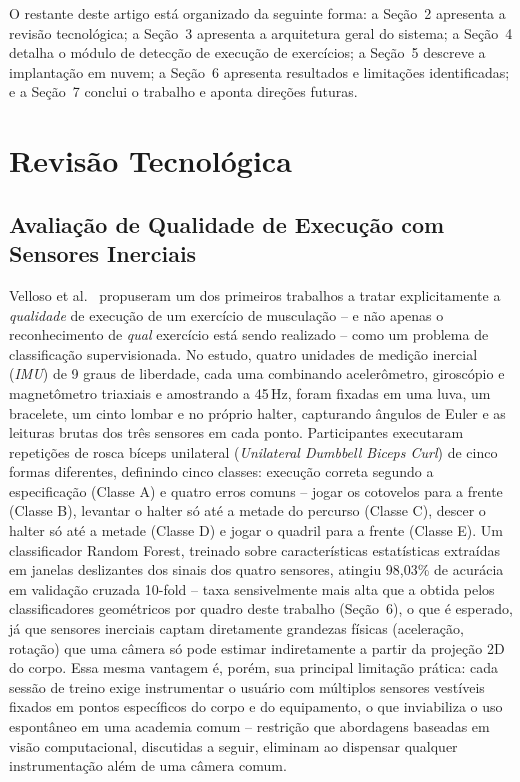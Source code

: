 \documentclass[12pt]{article}
\begin{document}
O restante deste artigo está organizado da seguinte forma: a Seção~2
apresenta a revisão tecnológica; a Seção~3 apresenta a arquitetura geral do
sistema; a Seção~4 detalha o módulo de detecção de execução de exercícios;
a Seção~5 descreve a implantação em nuvem; a Seção~6 apresenta resultados e
limitações identificadas; e a Seção~7 conclui o trabalho e aponta
direções futuras.

\section{Revisão Tecnológica}

\subsection{Avaliação de Qualidade de Execução com Sensores Inerciais}

Velloso et al.~\cite{velloso2013hars} propuseram um dos primeiros trabalhos
a tratar explicitamente a \textit{qualidade} de execução de um exercício de
musculação -- e não apenas o reconhecimento de \textit{qual} exercício está
sendo realizado -- como um problema de classificação supervisionada. No
estudo, quatro unidades de medição inercial (\textit{IMU}) de 9 graus de
liberdade, cada uma combinando acelerômetro, giroscópio e magnetômetro
triaxiais e amostrando a 45\,Hz, foram fixadas em uma luva, um bracelete, um
cinto lombar e no próprio halter, capturando ângulos de Euler e as leituras
brutas dos três sensores em cada ponto. Participantes executaram repetições
de rosca bíceps unilateral (\textit{Unilateral Dumbbell Biceps Curl}) de
cinco formas diferentes, definindo cinco classes: execução correta segundo a
especificação (Classe A) e quatro erros comuns -- jogar os cotovelos para a
frente (Classe B), levantar o halter só até a metade do percurso (Classe C),
descer o halter só até a metade (Classe D) e jogar o quadril para a frente
(Classe E). Um classificador Random Forest, treinado sobre características
estatísticas extraídas em janelas deslizantes dos sinais dos quatro
sensores, atingiu 98,03\% de acurácia em validação cruzada 10-fold -- taxa
sensivelmente mais alta que a obtida pelos classificadores geométricos por
quadro deste trabalho (Seção~6), o que é esperado, já que sensores
inerciais captam diretamente grandezas físicas (aceleração, rotação) que uma
câmera só pode estimar indiretamente a partir da projeção 2D do corpo. Essa
mesma vantagem é, porém, sua principal limitação prática: cada sessão de
treino exige instrumentar o usuário com múltiplos sensores vestíveis fixados
em pontos específicos do corpo e do equipamento, o que inviabiliza o uso
espontâneo em uma academia comum -- restrição que abordagens baseadas em
visão computacional, discutidas a seguir, eliminam ao dispensar qualquer
instrumentação além de uma câmera comum.
\end{document}
